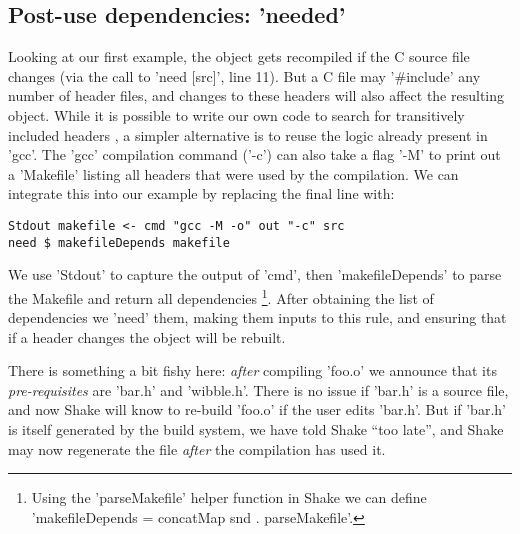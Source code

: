 \subsection{Post-use dependencies: \lst'needed'\label{sec:needed}}

Looking at our first example, the object gets recompiled if the C source file
changes (via the call to \lst'need [src]', line 11).
But a C file may \lst'#include' any number of header files, and changes
to these headers will also affect the resulting object. While it is possible to
write our own code to search for transitively included headers
\cite[\S6.4]{shake}, a simpler alternative is to reuse the logic already present
in \lst'gcc'. The \lst'gcc' compilation command (\lst'-c') can also take a flag
\lst'-M' to print out a \lst'Makefile' listing all headers that were used by the
compilation. We can integrate this into our example by replacing the final
line with:

\begin{lstlisting}
Stdout makefile <- cmd "gcc -M -o" out "-c" src
need $ makefileDepends makefile
\end{lstlisting}

\noindent We use \lst'Stdout' to capture the output of \lst'cmd', then
\lst'makefileDepends' to parse the Makefile and return all dependencies
\footnote{Using the \lst'parseMakefile' helper function in Shake we can define
\lst'makefileDepends = concatMap snd . parseMakefile'.}. After obtaining the
list of dependencies we \lst'need' them, making them inputs to this rule, and
ensuring that if a header changes the object will be rebuilt.

There is something a bit fishy here: \emph{after} compiling \lst'foo.o' we
announce that its \emph{pre-requisites} are \lst'bar.h' and \lst'wibble.h'.
There is no issue if \lst'bar.h' is a source file, and now
Shake will know to re-build \lst'foo.o' if the user edits \lst'bar.h'.
But if \lst'bar.h' is itself generated by the build system,
we have told Shake ``too late'', and Shake may now regenerate the file
\emph{after} the compilation has used it.


